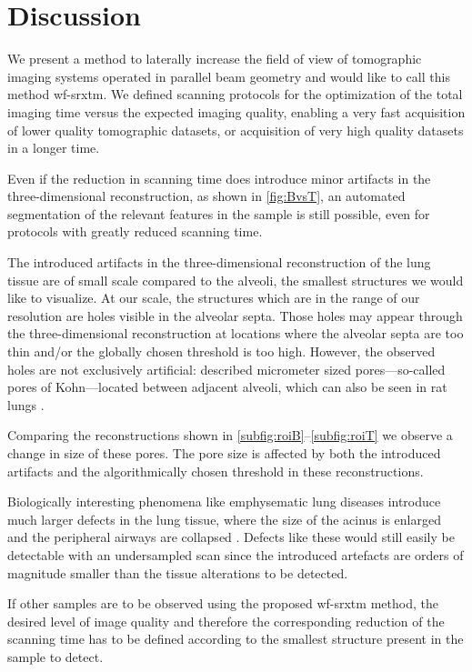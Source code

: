 \section{Discussion}\label{sec:Discussion}
We present a method to laterally increase the field of view of tomographic imaging systems operated in parallel beam geometry and would like to call this method \ac{wf-srxtm}. We defined scanning protocols for the optimization of the total imaging time versus the expected imaging quality, enabling a very fast acquisition of lower quality tomographic datasets, or acquisition of very high quality datasets in a longer time.

Even if the reduction in scanning time does introduce minor artifacts in the three-dimensional reconstruction, as shown in \autoref{fig:BvsT}, an automated segmentation of the relevant features in the sample is still possible, even for protocols with greatly reduced scanning time. 

The introduced artifacts in the three-dimensional reconstruction of the lung tissue are of small scale compared to the alveoli, the smallest structures we would like to visualize. At our scale, the structures which are in the range of our resolution are holes visible in the alveolar septa. Those holes may appear through the three-dimensional reconstruction at locations where the alveolar septa are too thin and/or the globally chosen threshold is too high. However, the observed holes are not exclusively artificial: \citet{Kohn1893} described micrometer sized pores---so-called pores of Kohn---located between adjacent alveoli, which can also be seen in rat lungs \cite{Vanmeir1991}.

Comparing the reconstructions shown in \autoref{subfig:roiB}--\ref{subfig:roiT} we observe a change in size of these pores. The pore size is affected by both the introduced artifacts and the algorithmically chosen threshold in these reconstructions.

Biologically interesting phenomena like emphysematic lung diseases introduce much larger defects in the lung tissue, where the size of the acinus is enlarged and the peripheral airways are collapsed \cite{Weibel2009}. Defects like these would still easily be detectable with an undersampled scan since the introduced artefacts are orders of magnitude smaller than the tissue alterations to be detected.

If other samples are to be observed using the proposed \ac{wf-srxtm} method, the desired level of image quality and therefore the corresponding reduction of the scanning time has to be defined according to the smallest structure present in the sample to detect.

